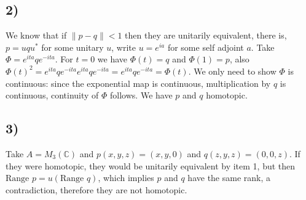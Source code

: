 \documentclass{article}
\begin{document}
\subsection*{2)}

We know that if $\|p-q\|<1$ then they are unitarily equivalent, there is, $p=uqu^\ast$ for 
some unitary $u$, write $u=e^{ia}$ for some self adjoint $a$. Take $\Phi=e^{ita}qe^{-ita}$.
For $t=0$ we have $\Phi(t)=q$ and $\Phi(1)=p$, also $\Phi(t)^2=e^{ita}qe^{-ita}e^{ita}qe^{-ita}=
e^{ita}qe^{-ita}=\Phi(t)$. We only need to show $\Phi$ is continuous: since the exponential
map is continuous, multiplication by $q$ is continuous, continuity of $\Phi$ follows. 
We have $p$ and $q$ homotopic.


\subsection*{3)}

Take $A=M_3(\mathbb{C})$ and $p(x,y,z)=(x,y,0)$ and $q(z,y,z)=(0,0,z)$.
If they were homotopic, they would be unitarily equivalent by item 1, but
then $\text{Range } p=u (\text{Range } q)$, which implies $p$ and $q$ have the 
same rank, a contradiction, therefore they are not homotopic.
\end{document}
